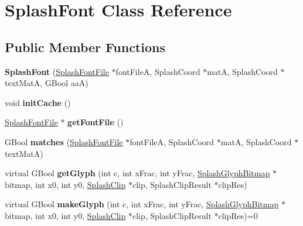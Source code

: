 \hypertarget{class_splash_font}{}\section{Splash\+Font Class Reference}
\label{class_splash_font}
\subsection*{Public Member Functions}
\begin{DoxyCompactItemize}
\item 
\mbox{\label{class_splash_font_a1cea5213f73556761bf67abb1f83ca6b}} 
{\bfseries Splash\+Font} (\hyperlink{class_splash_font_file}{Splash\+Font\+File} $\ast$font\+FileA, Splash\+Coord $\ast$matA, Splash\+Coord $\ast$text\+MatA, G\+Bool aaA)
\item 
\mbox{\label{class_splash_font_ac29ec0338660bf9949704640c7d389f1}} 
void {\bfseries init\+Cache} ()
\item 
\mbox{\label{class_splash_font_a6390670c82d9a84cfdc74c51695b5d23}} 
\hyperlink{class_splash_font_file}{Splash\+Font\+File} $\ast$ {\bfseries get\+Font\+File} ()
\item 
\mbox{\label{class_splash_font_a804407d242abcbfb3498ce2eadaeb294}} 
G\+Bool {\bfseries matches} (\hyperlink{class_splash_font_file}{Splash\+Font\+File} $\ast$font\+FileA, Splash\+Coord $\ast$matA, Splash\+Coord $\ast$text\+MatA)
\item 
\mbox{\label{class_splash_font_a4aa28b2e4d769aea446d6fee10916e65}} 
virtual G\+Bool {\bfseries get\+Glyph} (int c, int x\+Frac, int y\+Frac, \hyperlink{struct_splash_glyph_bitmap}{Splash\+Glyph\+Bitmap} $\ast$bitmap, int x0, int y0, \hyperlink{class_splash_clip}{Splash\+Clip} $\ast$clip, Splash\+Clip\+Result $\ast$clip\+Res)
\item 
\mbox{\label{class_splash_font_a44257b964c6150576c9a512dcac84e27}} 
virtual G\+Bool {\bfseries make\+Glyph} (int c, int x\+Frac, int y\+Frac, \hyperlink{struct_splash_glyph_bitmap}{Splash\+Glyph\+Bitmap} $\ast$bitmap, int x0, int y0, \hyperlink{class_splash_clip}{Splash\+Clip} $\ast$clip, Splash\+Clip\+Result $\ast$clip\+Res)=0

\end{DoxyCompactItemize}
